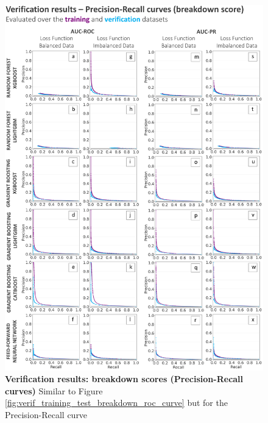 \documentclass[nhess, manuscript]{copernicus}
\begin{document}
\begin{figure}[t]
\includegraphics[width=12cm]{figures/verif_training_test_breakdown_pr_curve.png}
\caption{\textbf{Verification results: breakdown scores (Precision-Recall curves)} Similar to Figure \ref{fig:verif_training_test_breakdown_roc_curve} but for the Precision-Recall curve} 
\label{fig:verif_training_test_breakdown_pr_curve}
\end{figure}
\end{document}

